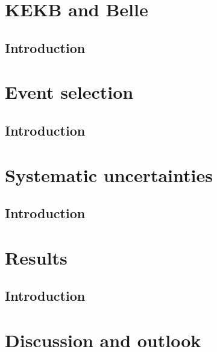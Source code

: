 \chapter{KEKB and Belle}
\section{Introduction}

\chapter{Event selection}
\section{Introduction}

\chapter{Systematic uncertainties}
\section{Introduction}

\chapter{Results}
\section{Introduction}

\chapter{Discussion and outlook}
